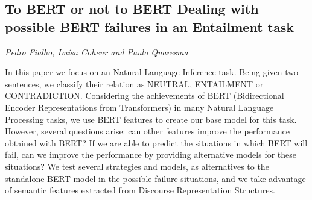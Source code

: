 \documentclass[../booklet.tex]{subfiles}
\begin{document}
\subsection[To BERT or not to BERT Dealing with possible BERT failures in an Entailment task. {\it Pedro Fialho, Luísa Coheur and Paulo Quaresma}]{To BERT or not to BERT Dealing with possible BERT failures in an Entailment task}
  

\begin{center}
  {\it Pedro Fialho, Luísa Coheur and Paulo Quaresma}
\end{center}



In this paper we focus on an Natural Language Inference task. Being given two sentences, we classify their relation as NEUTRAL, ENTAILMENT or CONTRADICTION. Considering the achievements of BERT (Bidirectional Encoder Representations from Transformers) in many Natural Language Processing tasks, we use BERT features to create our base model for this task. However, several questions arise: can other features improve the performance obtained with BERT? If we are able to predict the situations in which BERT will fail, can we improve the performance by providing alternative models for these situations? We test several strategies and models, as alternatives to the standalone BERT model in the possible failure situations, and we take advantage of semantic features extracted from Discourse Representation Structures.

\end{document}
